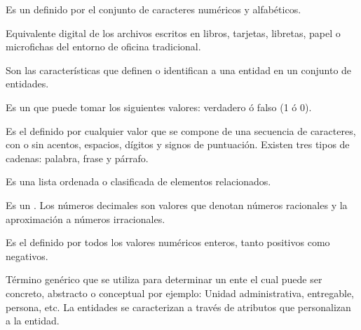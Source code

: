   \begin{description}
  
     Es un  definido por el conjunto de caracteres numéricos y alfabéticos.
    
     Equivalente digital de los archivos escritos en libros, tarjetas, libretas, papel o microfichas del entorno de oficina tradicional.
    
     Son las características que definen o identifican a una entidad en un conjunto de entidades.

     Es un  que puede tomar los siguientes valores: verdadero ó falso (1 ó 0).
    
     Es el  definido por cualquier valor que se compone de una secuencia de caracteres, con o sin acentos, espacios, dígitos y signos de puntuación. Existen tres tipos de cadenas: palabra, frase y párrafo.
    
     Es una lista ordenada o clasificada de elementos relacionados.
    
     Es un  . Los números decimales son valores que denotan números racionales y la aproximación a números irracionales.
    
     Es el   definido por todos los valores numéricos enteros, tanto positivos como negativos.

     Término genérico que se utiliza para determinar un ente el cual puede ser concreto, abstracto o conceptual por ejemplo: Unidad administrativa, entregable, persona, etc. La entidades se caracterizan a través de atributos que personalizan a la entidad.		


\end{description}

